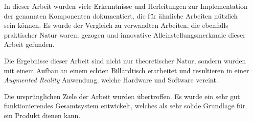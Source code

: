 In dieser Arbeit wurden viele Erkenntnisse und Herleitungen zur Implementation der genannten Komponenten dokumentiert, die für ähnliche Arbeiten nützlich sein können.
Es wurde der Vergleich zu verwandten Arbeiten, die ebenfalls praktischer Natur waren, gezogen und innovative Alleinstellungsmerkmale dieser Arbeit gefunden.

Die Ergebnisse dieser Arbeit sind nicht nur theoretischer Natur, sondern wurden mit einem Aufbau an einem echten Billardtisch
erarbeitet und resultieren in einer \emph{Augmented Reality} Anwendung, welche Hardware und Software vereint.

Die ursprünglichen Ziele der Arbeit wurden übertroffen.
Es wurde ein sehr gut funktionierendes Gesamtsystem entwickelt, welches als sehr solide Grundlage für ein Produkt dienen kann.
